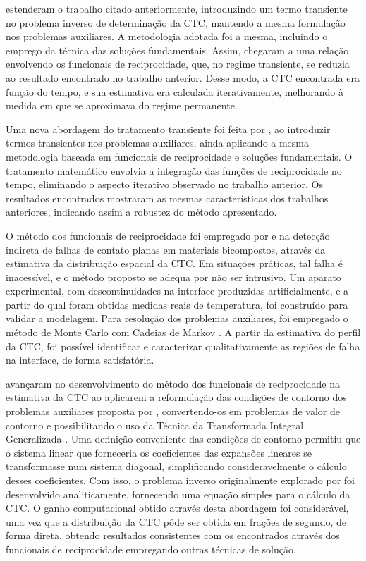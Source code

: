 \cite{artigo_colaco_2} estenderam o trabalho citado anteriormente, introduzindo um termo transiente no problema inverso de determinação da CTC, mantendo a mesma formulação
nos problemas auxiliares. A
metodologia adotada foi a mesma, incluindo o emprego da técnica das soluções fundamentais. Assim, chegaram a uma relação envolvendo os funcionais de reciprocidade,
que, no regime transiente, se reduzia ao resultado encontrado no trabalho anterior. Desse modo, a CTC encontrada era função do tempo, e sua estimativa era calculada 
iterativamente, melhorando à medida em que se aproximava do regime permanente.

Uma nova abordagem do tratamento transiente foi feita por \cite{artigo_colaco_4},
ao introduzir termos transientes nos problemas auxiliares, ainda aplicando a mesma metodologia baseada em funcionais de reciprocidade e soluções fundamentais. O tratamento
matemático envolvia a integração das funções de reciprocidade no tempo, eliminando o aspecto iterativo observado no trabalho anterior. Os resultados encontrados mostraram
as mesmas características dos trabalhos anteriores, indicando assim a robustez do método apresentado.

O método dos funcionais de reciprocidade foi empregado por \cite{tese_abreu} e \cite{artigo_abreu_3} na detecção indireta de falhas de contato planas em materiais bicompostos, através da estimativa da distribuição espacial da CTC.
Em situações práticas, tal falha é inacessível, e o método proposto se adequa por não ser intrusivo. Um aparato experimental, com descontinuidades na interface produzidas artificialmente, e a partir
do qual foram obtidas medidas reais de temperatura, foi construído para validar a modelagem. Para resolução dos problemas auxiliares, foi empregado o método 
de Monte Carlo com Cadeias de Markov \citep{artigo_mcmc}. A partir da estimativa do perfil da CTC, foi possível identificar e caracterizar qualitativamente as regiões de falha na interface,
de forma satisfatória.

\cite{artigo_padilha_3} avançaram no desenvolvimento do método dos funcionais de reciprocidade na estimativa da CTC ao aplicarem a reformulação das condições de contorno 
dos problemas auxiliares proposta por \cite{tese_abreu}, convertendo-os em problemas de valor de contorno e possibilitando o uso da Técnica da Transformada Integral Generalizada \citep{livro_integral_transforms_cotta}.
Uma definição conveniente das condições de contorno permitiu que o sistema linear que forneceria os coeficientes das expansões lineares se transformasse num sistema diagonal, simplificando
consideravelmente o cálculo desses coeficientes. Com isso, 
o problema inverso originalmente explorado por \cite{reciproc_3} foi desenvolvido analiticamente, fornecendo uma equação simples para o cálculo da CTC. O ganho
computacional obtido através desta abordagem foi considerável, uma vez que a distribuição da CTC pôde ser obtida em frações de segundo, de forma direta, obtendo resultados consistentes
com os encontrados através dos funcionais de reciprocidade empregando outras técnicas de solução.

